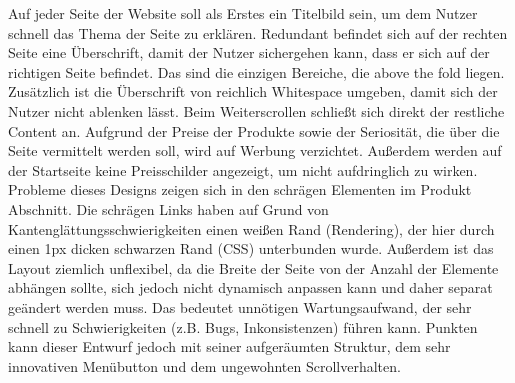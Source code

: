 Auf jeder Seite der Website soll als Erstes ein Titelbild sein, um dem Nutzer schnell das Thema der Seite zu erklären. Redundant befindet sich auf der rechten Seite eine Überschrift, damit der Nutzer sichergehen kann, dass er sich auf der richtigen Seite befindet. Das sind die einzigen Bereiche, die above the fold liegen. Zusätzlich ist die Überschrift von reichlich Whitespace umgeben, damit sich der Nutzer nicht ablenken lässt. Beim Weiterscrollen schließt sich direkt der restliche Content an.
Aufgrund der Preise der Produkte sowie der Seriosität, die über die Seite vermittelt werden soll, wird auf Werbung verzichtet. Außerdem werden auf der Startseite keine Preisschilder angezeigt, um nicht aufdringlich zu wirken.
\label{inno_probs}
Probleme dieses Designs zeigen sich in den schrägen Elementen im Produkt Abschnitt. Die schrägen Links haben auf Grund von Kantenglättungsschwierigkeiten einen weißen Rand (Rendering), der hier durch einen 1px dicken schwarzen Rand (CSS) unterbunden wurde. Außerdem ist das Layout ziemlich unflexibel, da die Breite der Seite von der Anzahl der Elemente abhängen sollte, sich jedoch nicht dynamisch anpassen kann und daher separat geändert werden muss. Das bedeutet unnötigen Wartungsaufwand, der sehr schnell zu Schwierigkeiten (z.B. Bugs, Inkonsistenzen) führen kann.
Punkten kann dieser Entwurf jedoch mit seiner aufgeräumten Struktur, dem sehr innovativen Menübutton und dem ungewohnten Scrollverhalten.
